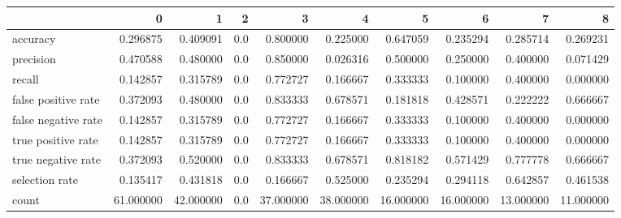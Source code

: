 \begin{tabular}{lrrrrrrrrr}
\toprule
{} &          0 &          1 &    2 &          3 &          4 &          5 &          6 &          7 &          8 \\
\midrule
accuracy            &   0.296875 &   0.409091 &  0.0 &   0.800000 &   0.225000 &   0.647059 &   0.235294 &   0.285714 &   0.269231 \\
precision           &   0.470588 &   0.480000 &  0.0 &   0.850000 &   0.026316 &   0.500000 &   0.250000 &   0.400000 &   0.071429 \\
recall              &   0.142857 &   0.315789 &  0.0 &   0.772727 &   0.166667 &   0.333333 &   0.100000 &   0.400000 &   0.000000 \\
false positive rate &   0.372093 &   0.480000 &  0.0 &   0.833333 &   0.678571 &   0.181818 &   0.428571 &   0.222222 &   0.666667 \\
false negative rate &   0.142857 &   0.315789 &  0.0 &   0.772727 &   0.166667 &   0.333333 &   0.100000 &   0.400000 &   0.000000 \\
true positive rate  &   0.142857 &   0.315789 &  0.0 &   0.772727 &   0.166667 &   0.333333 &   0.100000 &   0.400000 &   0.000000 \\
true negative rate  &   0.372093 &   0.520000 &  0.0 &   0.833333 &   0.678571 &   0.818182 &   0.571429 &   0.777778 &   0.666667 \\
selection rate      &   0.135417 &   0.431818 &  0.0 &   0.166667 &   0.525000 &   0.235294 &   0.294118 &   0.642857 &   0.461538 \\
count               &  61.000000 &  42.000000 &  0.0 &  37.000000 &  38.000000 &  16.000000 &  16.000000 &  13.000000 &  11.000000 \\
\bottomrule
\end{tabular}

